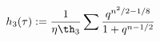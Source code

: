 \begin{equation}
  h_3 (\tau) := {1\over \eta \th_3}  \sum {q^{n^2/2-1/8} \over 1+q^{n-1/2}}
\end{equation}

